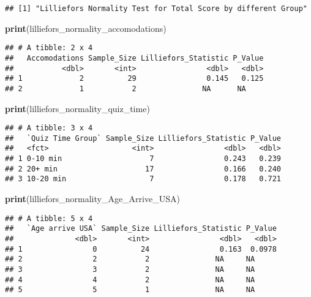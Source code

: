 \documentclass[
]{article}
\newenvironment{Shaded}{\begin{snugshade}}{\end{snugshade}}
\newcommand{\FunctionTok}[1]{\textcolor[rgb]{0.13,0.29,0.53}{\textbf{#1}}}
\newcommand{\NormalTok}[1]{#1}
\begin{document}
\begin{verbatim}
## [1] "Lilliefors Normality Test for Total Score by different Group"
\end{verbatim}

\begin{Shaded}
\begin{Highlighting}[]
\FunctionTok{print}\NormalTok{(lilliefors\_normality\_accomodations)}
\end{Highlighting}
\end{Shaded}

\begin{verbatim}
## # A tibble: 2 x 4
##   Accomodations Sample_Size Lilliefors_Statistic P_Value
##           <dbl>       <int>                <dbl>   <dbl>
## 1             2          29                0.145   0.125
## 2             1           2               NA      NA
\end{verbatim}

\begin{Shaded}
\begin{Highlighting}[]
\FunctionTok{print}\NormalTok{(lilliefors\_normality\_quiz\_time)}
\end{Highlighting}
\end{Shaded}

\begin{verbatim}
## # A tibble: 3 x 4
##   `Quiz Time Group` Sample_Size Lilliefors_Statistic P_Value
##   <fct>                   <int>                <dbl>   <dbl>
## 1 0-10 min                    7                0.243   0.239
## 2 20+ min                    17                0.166   0.240
## 3 10-20 min                   7                0.178   0.721
\end{verbatim}

\begin{Shaded}
\begin{Highlighting}[]
\FunctionTok{print}\NormalTok{(lilliefors\_normality\_Age\_Arrive\_USA)}
\end{Highlighting}
\end{Shaded}

\begin{verbatim}
## # A tibble: 5 x 4
##   `Age arrive USA` Sample_Size Lilliefors_Statistic P_Value
##              <dbl>       <int>                <dbl>   <dbl>
## 1                0          24                0.163  0.0978
## 2                2           2               NA     NA     
## 3                3           2               NA     NA     
## 4                4           2               NA     NA     
## 5                5           1               NA     NA
\end{verbatim}
\end{document}

